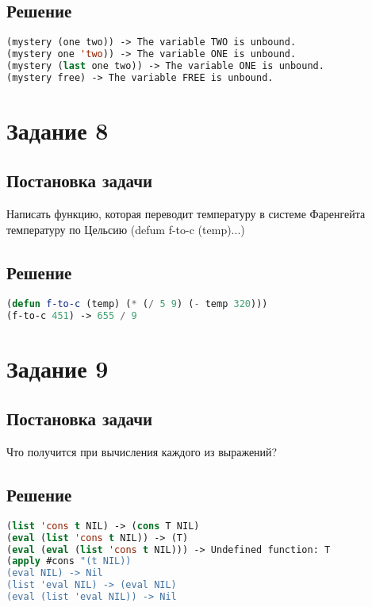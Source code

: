 \subsection*{Решение}

\begin{lstlisting}[label=7xd,caption=Решение задания №7, language=lisp]
(mystery (one two)) -> The variable TWO is unbound.
(mystery one 'two)) -> The variable ONE is unbound.
(mystery (last one two)) -> The variable ONE is unbound.
(mystery free) -> The variable FREE is unbound.

\end{lstlisting}

\section*{Задание 8}
\subsection*{Постановка задачи}
Написать функцию, которая переводит температуру в системе Фаренгейта
температуру по Цельсию (defum f-to-c (temp)...)

\subsection*{Решение}

\begin{lstlisting}[label=7xd,caption=Решение задания №8, language=lisp]
(defun f-to-c (temp) (* (/ 5 9) (- temp 320)))
(f-to-c 451) -> 655 / 9
\end{lstlisting}

\section*{Задание 9}
\subsection*{Постановка задачи}
Что получится при вычисления каждого из выражений?

\subsection*{Решение}

\begin{lstlisting}[label=7xd,caption=Решение задания №8, language=lisp]
(list 'cons t NIL) -> (cons T NIL)
(eval (list 'cons t NIL)) -> (T)
(eval (eval (list 'cons t NIL))) -> Undefined function: T
(apply #cons "(t NIL))
(eval NIL) -> Nil
(list 'eval NIL) -> (eval NIL)
(eval (list 'eval NIL)) -> Nil
\end{lstlisting}



